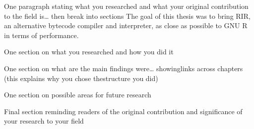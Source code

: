 One paragraph stating what you researched and what your original contribution to the field is… then break into sections
The goal of this thesis was to bring RIR, an alternative bytecode compiler and interpreter, as close as possible to GNU R in terms of performance. 



One section on what you researched and how you did it



One section on what are the main findings were… showinglinks across chapters (this explains why you chose thestructure you did)



One section on possible areas for future research



Final section reminding readers of the original contribution and significance of your research to your field



